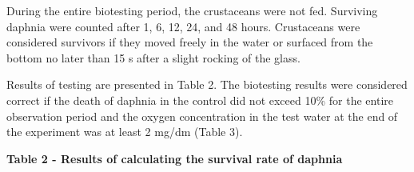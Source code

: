 During the entire biotesting period, the crustaceans were not fed.
Surviving daphnia were counted after 1, 6, 12, 24, and 48 hours.
Crustaceans were considered survivors if they moved freely in the water
or surfaced from the bottom no later than 15 s after a slight rocking of
the glass.

Results of testing are presented in Table 2. The biotesting results were
considered correct if the death of daphnia in the control did not exceed
10\% for the entire observation period and the oxygen concentration in
the test water at the end of the experiment was at least 2
mg/dm (Table 3).

{\bfseries Table 2 - Results of calculating the survival rate of daphnia}

